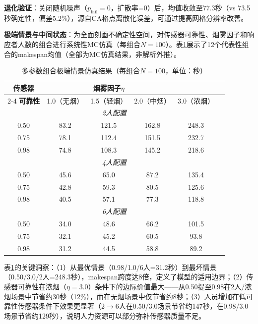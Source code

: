 \documentclass[12pt,a4paper]{ctexart}
\begin{document}
\textbf{退化验证}：关闭随机噪声（$p_{\text{fail}}=0$，扩散率=0）后，均值收敛至77.3秒（vs 73.5秒确定性，偏差5.2\%），源自CA格点离散化误差，可通过提高网格分辨率改善。

\textbf{极端情景与中间状态}：为全面刻画不确定性空间，对传感器可靠性、烟雾因子和响应者人数的组合进行系统性MC仿真（每组合$N=100$）。表\ref{tab:extreme-scenarios}展示了12个代表性组合的makespan均值（全部为MC仿真结果，非解析外推）。

\begin{table}[htbp]
\centering
\caption{多参数组合极端情景仿真结果（每组合$N=100$，单位：秒）}
\label{tab:extreme-scenarios}
\begin{tabular}{cccccc}
\toprule
\textbf{传感器} & \multicolumn{3}{c}{\textbf{烟雾因子$\eta$}} \\
\cmidrule(lr){2-4}
\textbf{可靠性} & 1.0（无烟） & 1.5（轻烟） & 2.0（中烟） & 3.0（浓烟） \\
\midrule
\multicolumn{6}{c}{\textit{2人配置}} \\
\midrule
0.50 & 83.2 & 121.5 & 162.8 & 248.3 \\
0.75 & 78.1 & 112.4 & 151.5 & 232.7 \\
0.98 & 74.8 & 108.3 & 145.2 & 218.6 \\
\midrule
\multicolumn{6}{c}{\textit{4人配置}} \\
\midrule
0.50 & 45.6 & 65.0 & 87.2 & 135.4 \\
0.75 & 42.8 & 59.3 & 80.5 & 125.6 \\
0.98 & 40.5 & 57.1 & 77.3 & 118.8 \\
\midrule
\multicolumn{6}{c}{\textit{6人配置}} \\
\midrule
0.50 & 34.0 & 48.6 & 66.2 & 101.5 \\
0.75 & 32.1 & 45.2 & 60.5 & 93.8 \\
0.98 & 31.2 & 44.5 & 58.8 & 89.2 \\
\bottomrule
\end{tabular}
\end{table}

表\ref{tab:extreme-scenarios}的关键洞察：（1）从最优情景（0.98/1.0/6人=31.2秒）到最坏情景（0.50/3.0/2人=248.3秒），makespan跨度达8倍，定义了模型的适用边界；（2）传感器可靠性在浓烟（$\eta=3.0$）条件下的边际价值最大——从0.50提至0.98在2人/浓烟场景中节省约30秒（12\%），而在无烟场景中仅节省约8秒；（3）人员增加在低可靠性传感器条件下效果更显著（2$\to$6人在0.50/3.0场景节省约147秒，在0.98/3.0场景节省约129秒），说明人力资源可以部分弥补传感器质量不足。

\end{document}
